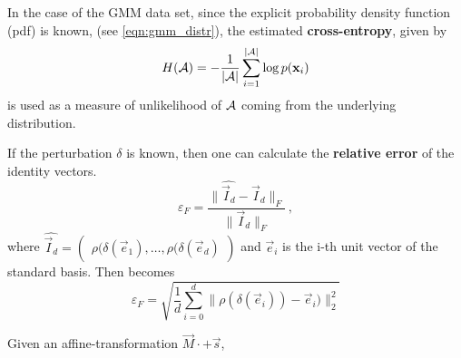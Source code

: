 In the case of the GMM data set, since the explicit probability density function (pdf) is known, 
(see \ref{eqn:gmm_distr}), the estimated \textbf{cross-entropy}, given by
\begin{equation}
\label{eqn:cross_entropy}
    H(\mathcal A) = - \frac 1 {|\mathcal A|} \sum_{i=1}^{|\mathcal A|} \log p(\mathbf x_i)
\end{equation}
is used as a measure of unlikelihood of $\mathcal A$ coming from the underlying distribution.


If the perturbation $\delta$ is known, then one can calculate the \textbf{relative error} of the identity vectors. 
\begin{equation}
\label{eqn:fro_error}
    \varepsilon_F = \frac {\|\widehat {\vec I_d} - \vec I_d\|_F} {\|\vec I_d\|_F} \,,
\end{equation}
where $\widehat {\vec I_d} = \begin{pmatrix} \rho (\delta (\vec e_1), \dots, \rho (\delta (\vec e_d) \end{pmatrix}$ and $\vec e_i$ is the i-th unit vector of the standard basis.
%
Then  becomes
\begin{equation}
\label{eqn:l2_error}
    \varepsilon_F = \sqrt{ \frac 1 d \sum_{i=0}^d \|\rho (\delta (\vec e_i)) - \vec e_i)\|_2^2}
\end{equation}

Given an affine-transformation $\vec M \cdot + \vec s$,

